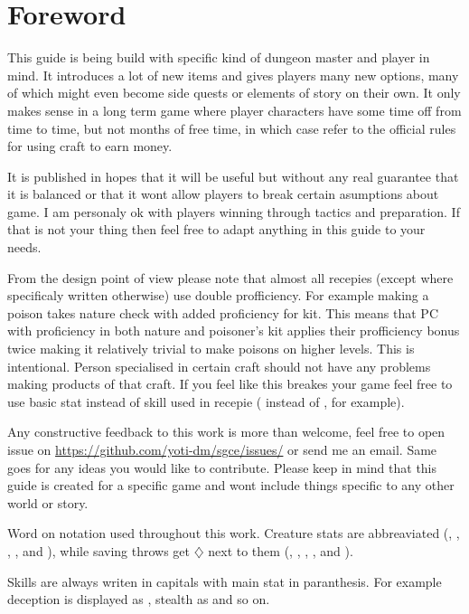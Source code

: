 \chapter*{Foreword}

This guide is being build with specific kind of dungeon master and player in mind. It introduces a lot of new items and gives players many new options, many of which might even become side quests or elements of story on their own. It only makes sense in a long term game where player characters have some time off from time to time, but not months of free time, in which case refer to the official rules for using craft to earn money.

It is published in hopes that it will be useful but without any real guarantee that it is balanced or that it wont allow players to break certain asumptions about game. I am personaly ok with players winning through tactics and preparation. If that is not your thing then feel free to adapt anything in this guide to your needs.

From the design point of view please note that almost all recepies (except where specificaly written otherwise) use double profficiency. For example making a poison takes nature check with added proficiency for kit. This means that PC with proficiency in both nature and poisoner's kit applies their profficiency bonus twice making it relatively trivial to make poisons on higher levels. This is intentional. Person specialised in certain craft should not have any problems making products of that craft. If you feel like this breakes your game feel free to use basic stat instead of skill used in recepie (\intelligence{} instead of \nature, for example).

Any constructive feedback to this work is more than welcome, feel free to open issue on \url{https://github.com/yoti-dm/sgce/issues/} or send me an email. Same goes for any ideas you would like to contribute. Please keep in mind that this guide is created for a specific game and wont include things specific to any other world or story.  

Word on notation used throughout this work. Creature stats are abbreaviated (\strength, \dexterity, \constitution, \intelligence, \wisdom{} and \charisma), while saving throws get $\diamondsuit$ next to them (\strengthsave, \dexteritysave, \constitutionsave, \intelligencesave, \wisdomsave{} and \charismasave).

Skills are always writen in capitals with main stat in paranthesis. For example deception is displayed as \deception, stealth as \stealth{} and so on.